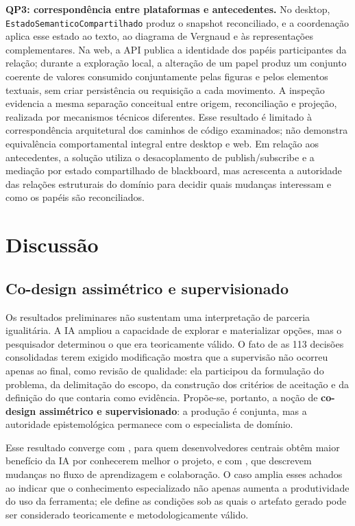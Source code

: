 \documentclass[preprint,12pt,authoryear]{elsarticle}
\begin{document}
\textbf{QP3: correspondência entre plataformas e antecedentes.} No desktop, \texttt{EstadoSemanticoCompartilhado} produz o snapshot reconciliado, e a coordenação aplica esse estado ao texto, ao diagrama de Vergnaud e às representações complementares. Na web, a API publica a identidade dos papéis participantes da relação; durante a exploração local, a alteração de um papel produz um conjunto coerente de valores consumido conjuntamente pelas figuras e pelos elementos textuais, sem criar persistência ou requisição a cada movimento. A inspeção evidencia a mesma separação conceitual entre origem, reconciliação e projeção, realizada por mecanismos técnicos diferentes. Esse resultado é limitado à correspondência arquitetural dos caminhos de código examinados; não demonstra equivalência comportamental integral entre desktop e web. Em relação aos antecedentes, a solução utiliza o desacoplamento de publish/subscribe e a mediação por estado compartilhado de blackboard, mas acrescenta a autoridade das relações estruturais do domínio para decidir quais mudanças interessam e como os papéis são reconciliados.

\section{Discussão}
\subsection{Co-design assimétrico e supervisionado}
Os resultados preliminares não sustentam uma interpretação de parceria igualitária. A IA ampliou a capacidade de explorar e materializar opções, mas o pesquisador determinou o que era teoricamente válido. O fato de as 113 decisões consolidadas terem exigido modificação mostra que a supervisão não ocorreu apenas ao final, como revisão de qualidade: ela participou da formulação do problema, da delimitação do escopo, da construção dos critérios de aceitação e da definição do que contaria como evidência. Propõe-se, portanto, a noção de \textbf{co-design assimétrico e supervisionado}: a produção é conjunta, mas a autoridade epistemológica permanece com o especialista de domínio.

Esse resultado converge com \citet{song2024impact}, para quem desenvolvedores centrais obtêm maior benefício da IA por conhecerem melhor o projeto, e com \citet{ulfsnes2024transforming}, que descrevem mudanças no fluxo de aprendizagem e colaboração. O caso amplia esses achados ao indicar que o conhecimento especializado não apenas aumenta a produtividade do uso da ferramenta; ele define as condições sob as quais o artefato gerado pode ser considerado teoricamente e metodologicamente válido.
\end{document}
